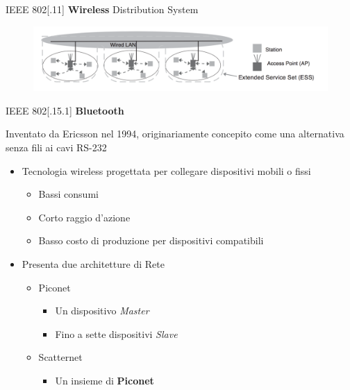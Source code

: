 	\begin{frame}{IEEE 802[.11]}
	\textbf{Wireless}
	\newline
	Distribution System
		\begin{figure}[h] 
			\includegraphics[scale=0.3,cfbox=blue_slides 1pt 0pt]{imgs/ds.png} %
		\end{figure}
\end{frame}
	
\begin{frame}{IEEE 802[.15.1]}
	\textbf{Bluetooth}
	\begin{block}{}
		Inventato da Ericsson nel 1994, originariamente concepito come una alternativa senza fili ai cavi RS-232
	\end{block}
	\pause
	\begin{itemize}[<+- | alert@+>]
		\item Tecnologia wireless progettata per collegare dispositivi mobili o fissi
			\begin{itemize}[<+- | alert@+>]
				\item Bassi consumi
				\item Corto raggio d'azione
				\item Basso costo di produzione per dispositivi compatibili
			\end{itemize}
			\item Presenta due architetture di Rete
			\begin{itemize}[<+- | alert@+>]
				\item Piconet
				\begin{itemize}
					\item Un dispositivo \textit{Master}
					\item Fino a sette dispositivi \textit{Slave}
				\end{itemize}
				\item Scatternet
				\begin{itemize}[<+- | alert@+>]
					\item Un insieme di \textbf{Piconet}
				\end{itemize}
			\end{itemize}
	\end{itemize}		
\end{frame}


